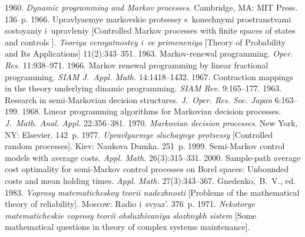  \begin{multicols}{2}

\renewcommand{\bibname}{\protect\rmfamily References}

{\small\frenchspacing
 {%
 \begin{thebibliography}{99}
 1960. \textit{Dynamic programming and Markov processes}. 
Cambridge, MA: MIT Press. 136~p.
 1966. Upravlyaemye markovskie protsessy 
s~konechnymi prostranstvami sostoyaniy i~upravleniy 
[Controlled Markov processes with finite spaces of states and controls ]. 
\textit{Teoriya veroyatnostey i~ee primeneniya} 
[Theory of Probability and Its Applications] 11(2):343--351.
 1963. Markov-renewal programming. 
\textit{Oper. Res.} 11:938--971.
 1966. Markov renewal programming by linear fractional programming. 
\textit{SIAM J.~Appl. Math.} 14:1418--1432.
 1967. Contraction mappings in the theory underlying dinamic 
programming. \textit{SIAM Rev.} 9:165--177.
 1963. Research in semi-Markovian decision structures. 
\textit{J.~Oper. Res. Soc. Japan} 6:163--199.
 1968. Linear programming algorithms 
for Markovian decision processes. \textit{J.~Math. Anal. Appl.} 22:356--381.
 1970. 
\textit{Markovian decision processes}. New York, NY: Elsevier. 142~p.
 1977. 
\textit{Upravlyaemye sluchaynye protsessy} 
[Controlled random processes]. Kiev: Naukova Dumka. 251~p.
 1999. 
Semi-Markov control models with average costs. \textit{Appl. Math.} 26(3):315--331.
 2000.  
Sample-path average cost optimality for semi-Markov control processes on Borel spaces: 
Unbounded costs and mean holding times. \textit{Appl. Math.} 27(3):343--367.
Gnedenko,~B.~V., ed. 1983. 
\textit{Voprosy matematicheskoy teorii nadezhnosti} 
[Problems of the mathematical theory of reliability].  Moscow: Radio i~svyaz'. 376~p.
 1971. 
\textit{Nekotorye matematicheskie voprosy teorii obsluzhivaniya slozhnykh sistem}  
[Some mathematical questions in theory of complex systems maintenance]. 

\end{thebibliography}}}
\end{multicols}
